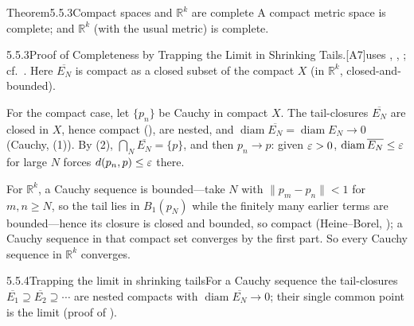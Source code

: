 \documentclass[main.tex]{subfiles}
\begin{document}
\begin{Obj}{Theorem}{5.5.3}{Compact spaces and $\mathbb R^k$ are complete}
A compact metric space is complete; and $\mathbb R^k$ (with the usual metric) is complete.
\end{Obj}
\begin{Prf}{5.5.3}{Proof of Completeness by Trapping the Limit in Shrinking Tails.}{[A7]\quad uses , , ; cf.\ . Here $\overline{E_N}$ is compact as a closed subset of the compact $X$ (in $\mathbb R^k$, closed-and-bounded).}
\item For the compact case, let $\{p_n\}$ be Cauchy in compact $X$. The tail-closures $\overline{E_N}$ are
  closed in $X$, hence compact (), are nested, and $\operatorname{diam}\overline{E_N}=\operatorname{diam}
  E_N\to0$ (Cauchy, (1)). By (2), $\bigcap_N\overline{E_N}=\{p\}$, and then
  $p_n\to p$: given $\varepsilon>0$, $\operatorname{diam}\overline{E_N}\le\varepsilon$ for large $N$ forces
  $d(p_n,p)\le\varepsilon$ there.
\item For $\mathbb R^k$, a Cauchy sequence is bounded---take $N$ with $\|p_m-p_n\|<1$ for $m,n\ge N$,
  so the tail lies in $B_1(p_N)$ while the finitely many earlier terms are bounded---hence its closure
  is closed and bounded, so compact (Heine--Borel, ); a Cauchy sequence in that compact
  set converges by the first part. So every Cauchy sequence in $\mathbb R^k$ converges.
\end{Prf}

\begin{Fig}{5.5.4}{Trapping the limit in shrinking tails}{For a Cauchy sequence the tail-closures $\overline{E_1}\supseteq\overline{E_2}\supseteq\cdots$ are nested compacts with $\operatorname{diam}\overline{E_N}\to0$; their single common point is the limit (proof of ).}
\end{Fig}

\ifSubfilesClassLoaded{\clearpage\objindex}{}
\end{document}
